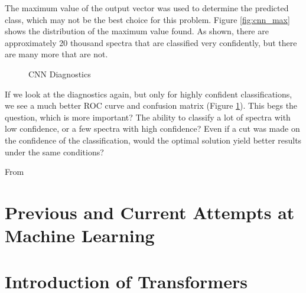 The maximum value of the output vector was used to determine the predicted class,
which may not be the best choice for this problem. Figure \ref{fig:cnn_max} shows
the distribution of the maximum value found. As shown, there are approximately 
20 thousand spectra that are classified very confidently, but there are many
more that are not.
\begin{figure}[h]
    \centering
    \qquad
    \caption{CNN Diagnostics}
    \label{fig:cnn_qual2}
\end{figure} 
If we look at the diagnostics again, but only for highly confident classifications,
we see a much better ROC curve and confusion matrix (Figure \ref{fig:cnn_qual2}). 
This begs the question, which is more important? The ability to classify a lot of 
spectra with low confidence, or a few spectra with high confidence? Even if a 
cut was made on the confidence of the classification, would the optimal solution
yield better results under the same conditions? 

From

\section{Previous and Current Attempts at Machine Learning}
\label{sec:previousML}

\section{Introduction of Transformers}
\label{sec:transformers}

